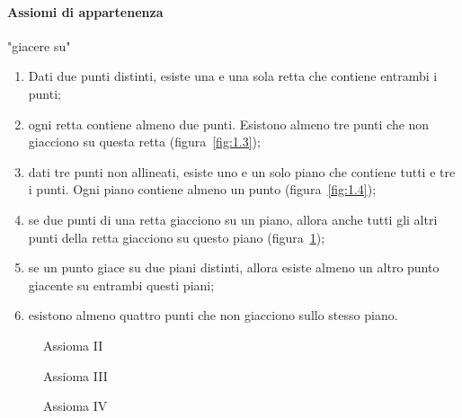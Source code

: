 {\paragraph{Assiomi di appartenenza} "giacere su"
\begin{enumerate}[label=\Roman{*}.]
\item Dati due punti distinti, esiste una e una sola retta che contiene entrambi i punti;
\item ogni retta contiene almeno due punti. Esistono almeno tre punti che non giacciono su questa retta (figura~\ref{fig:1.3});
\item dati tre punti non allineati, esiste uno e un solo piano che contiene tutti e tre i punti. Ogni piano contiene almeno un punto (figura~\ref{fig:1.4});
\item se due punti di una retta giacciono su un piano, allora anche tutti gli altri punti della retta giacciono su questo piano (figura~\ref{fig:1.5});
\item se un punto giace su due piani distinti, allora esiste almeno un altro punto giacente su entrambi questi piani;
\item esistono almeno quattro punti che non giacciono sullo stesso piano.
\end{enumerate}

\begin{figure}[b,t,h]
 \begin{minipage}[b]{.32\textwidth}
 \centering
 
 \caption{Assioma II}\label{fig:1.3}
 \end{minipage}
 \begin{minipage}[b]{.32\textwidth}
 \centering
 
 \caption{Assioma III}\label{fig:1.4}
 \end{minipage}
 \begin{minipage}[b]{.32\textwidth}
 \centering
 
 \caption{Assioma IV}\label{fig:1.5}
 \end{minipage}
\end{figure}

}
